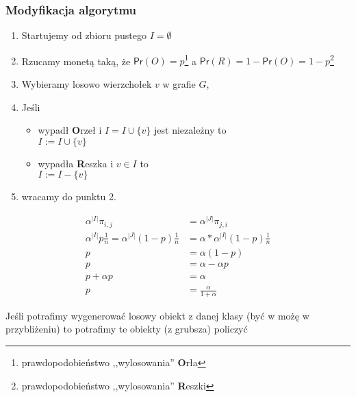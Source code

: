 \subsubsection{Modyfikacja algorytmu}
\begin{enumerate}
\item Startujemy od zbioru pustego $I=\emptyset $
\item Rzucamy monetą taką, że $\mathsf{Pr}(O)=p$\footnote{prawdopodobieństwo ,,wylosowania'' \textbf{O}rła} a $\mathsf{Pr}(R)=1-\mathsf{Pr}(O)=1-p$\footnote{prawdopodobieństwo ,,wylosowania'' \textbf{R}eszki}
\item Wybieramy losowo wierzchołek $v$ w grafie $G$,
\item Jeśli 
\begin{itemize}
\item[] wypadł \textbf{O}rzeł i $I=I\cup \{v\}$ jest niezależny to\\
$I:=I\cup \{v\}$
\item[] wypadła \textbf{R}eszka i $v\in I$ to\\
$I:=I- \{v\}$
\end{itemize}
\item wracamy do punktu 2.
\end{enumerate}

\begin{align*}
\alpha ^{|I|}\pi_{i,j}&=\alpha ^{|J|}\pi_{j,i}\\
\alpha ^{|I|}p\frac{1}{n}=\alpha ^{|J|}(1-p)\frac{1}{n}&=\alpha *\alpha ^{|I|}(1-p)\frac{1}{n}\\
p&=\alpha (1-p)\\
p&=\alpha -\alpha p\\
p+\alpha p&=\alpha\\
p&=\frac{\alpha}{1+\alpha}
\end{align*}

\begin{hipoterm}
Jeśli potrafimy wygenerować losowy obiekt z danej klasy (być w możę w przybliżeniu) to potrafimy te obiekty (z grubsza) policzyć
\end{hipoterm}

